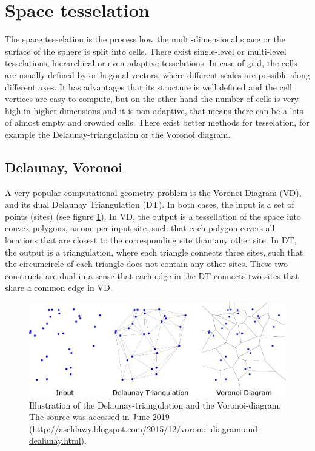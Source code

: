 \documentclass[12pt]{article}
\theoremstyle{plain}
\begin{document}

\pagebreak
\section{Space tesselation}

The space tesselation is the process how the multi-dimensional space or the surface of the sphere is split into cells. There exist single-level or multi-level tesselations, hierarchical or even adaptive tesselations. In case of grid, the cells are usually defined by orthogonal vectors, where different scales are possible along different axes. It has advantages that its structure is well defined and the cell vertices are easy to compute, but on the other hand the number of cells is very high in higher dimensions and it is non-adaptive, that means there can be a lots of almost empty and crowded cells. There exist better methods for tesselation, for example the Delaunay-triangulation or the Voronoi diagram.

\subsection{Delaunay, Voronoi}

A very popular computational geometry problem is the Voronoi Diagram (VD), and its dual Delaunay Triangulation (DT). In both cases, the input is a set of points (sites) (see figure \ref{delavoro}). In VD, the output is a tessellation of the space into convex polygons, as one per input site, such that each polygon covers all locations that are closest to the corresponding site than any other site. In DT, the output is a triangulation, where each triangle connects three sites, such that the circumcircle of each triangle does not contain any other sites. These two constructs are dual in a sense that each edge in the DT connects two sites that share a common edge in VD.

\begin{figure}[h!]
    \centering
	\includegraphics[width=.9\linewidth]{media/delavoro.png}
	\caption{Illustration of the Delaunay-triangulation and the Voronoi-diagram. The source was accessed in June 2019 (\url{http://aseldawy.blogspot.com/2015/12/voronoi-diagram-and-dealunay.html}).}
	\label{delavoro}
\end{figure}
\end{document}
